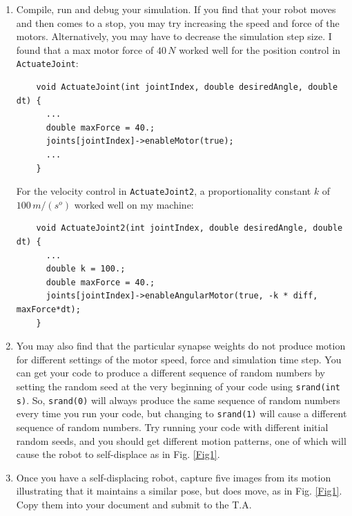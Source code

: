 \documentclass[12pt]{article}
\begin{document}
\begin{enumerate}
\item Compile, run and debug your simulation. If you find that your robot moves and then comes to a stop, you may try increasing the speed and force of the motors. Alternatively, you may have to decrease the simulation step size. I found that a max motor force of $40\, N$ worked well for the position control in \verb|ActuateJoint|:

\begin{verbatim}
    void ActuateJoint(int jointIndex, double desiredAngle, double dt) {
      ...
      double maxForce = 40.;
      joints[jointIndex]->enableMotor(true);
      ...
    }
\end{verbatim}

For the velocity control in \verb|ActuateJoint2|, a proportionality constant $k$ of $100\, m/(s^o) $ worked well on my machine: 

\begin{verbatim}
    void ActuateJoint2(int jointIndex, double desiredAngle, double dt) {
      ...
      double k = 100.;
      double maxForce = 40.;
      joints[jointIndex]->enableAngularMotor(true, -k * diff, maxForce*dt);
    }
\end{verbatim}

\item You may also find that the particular synapse weights do not produce motion for different settings of the motor speed, force and simulation time step. You can get your code to produce a different sequence of random numbers by setting the random seed at the very beginning of your code using \texttt{srand(int s)}. So, \texttt{srand(0)} will always produce the same sequence of random numbers every time you run your code, but changing to \texttt{srand(1)} will cause a different sequence of random numbers. Try running your code with different initial random seeds, and you should get different motion patterns, one of which will cause the robot to self-displace as in Fig. \ref{Fig1}.

\item Once you have a self-displacing robot, capture five images from its motion illustrating that it maintains a similar pose, but does move, as in Fig. \ref{Fig1}. Copy them into your document and submit to the T.A.

\end{enumerate}
\end{document}
